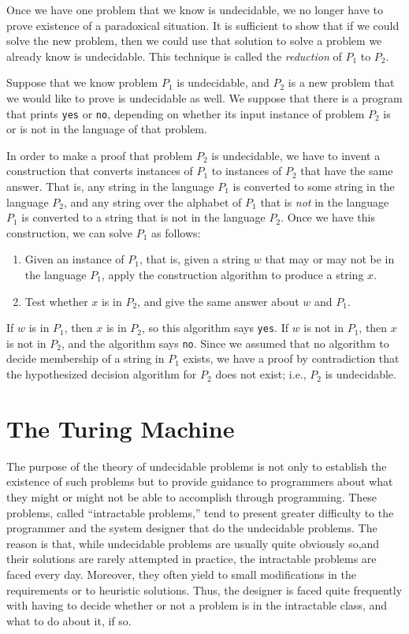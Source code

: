 \documentclass[]{article}
\begin{document}
    Once we have one problem that we know is undecidable, we no longer have to
    prove existence of a paradoxical situation. It is sufficient to show that 
    if we could solve the new problem, then we could use that solution to solve 
    a problem we already know is undecidable. This technique is called the
    \emph{reduction} of $P_1$ to $P_2$.
    
    Suppose that we know problem $P_1$ is undecidable, and $P_2$ is a new
    problem that we would like to prove is undecidable as well. We suppose that
    there is a program that prints \texttt{yes} or \texttt{no}, depending on 
    whether its input instance of problem $P_2$ is or is not in the language of 
    that problem.
    
    In order to make a proof that problem $P_2$ is undecidable, we have to
    invent a construction that converts instances of $P_1$ to instances of 
    $P_2$ that have the same answer. That is, any string in the language $P_1$ 
    is converted to some string in the language $P_2$, and any string over the
    alphabet of $P_1$ that is \emph{not} in the language $P_1$ is converted to 
    a string that is not in the language $P_2$. Once we have this construction, 
    we can solve $P_1$ as follows:
      \begin{enumerate}
        \item Given an instance of $P_1$, that is, given a string $w$ that may 
        or may not be in the language $P_1$, apply the construction algorithm 
        to produce a string $x$.
        \item Test whether $x$ is in $P_2$, and give the same answer about $w$
        and $P_1$.
      \end{enumerate}
      
    If $w$ is in $P_1$, then $x$ is in $P_2$, so this algorithm says 
    \texttt{yes}. If $w$ is not in $P_1$, then $x$ is not in $P_2$, and the 
    algorithm says \texttt{no}. Since we assumed that no algorithm to decide
    membership of a string in $P_1$ exists, we have a proof by contradiction 
    that the hypothesized decision algorithm for $P_2$ does not exist; i.e., 
    $P_2$ is undecidable.
    
\section*{The Turing Machine}
  The purpose of the theory of undecidable problems is not only to establish 
  the existence of such problems but to provide guidance to programmers about 
  what they might or might not be able to accomplish through programming. These 
  problems, called ``intractable problems,'' tend to present greater difficulty 
  to the programmer and the system designer that do the undecidable problems. 
  The reason is that, while undecidable problems are usually quite obviously 
  so,and their solutions are rarely attempted in practice, the intractable 
  problems are faced every day. Moreover, they often yield to small 
  modifications in the requirements or to heuristic solutions. Thus, the 
  designer is faced quite frequently with having to decide whether or not a 
  problem is in the intractable class, and what to do about it, if so.
  
\end{document}
